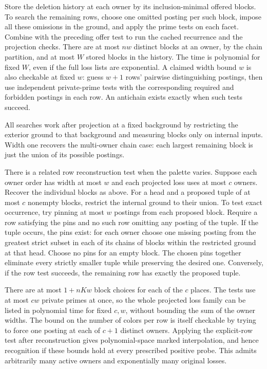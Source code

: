 Store the deletion history at each owner by its
inclusion-minimal offered blocks. To search the
remaining rows, choose one omitted posting per such
block, impose all these omissions in the ground,
and apply the prime tests on each facet. Combine with
the preceding offer test to run the cached recurrence
and the projection checks. There are at most $nw$
distinct blocks at an owner, by the chain partition,
and at most $W$ stored blocks in the history.
The time is polynomial for fixed $W$, even if the
full loss lists are exponential. A claimed width bound
$w$ is also checkable at fixed $w$: guess $w+1$
rows' pairwise distinguishing postings, then use
independent private-prime tests with the corresponding
required and forbidden postings in each row.
An antichain exists exactly when such tests succeed.

All searches work after projection at a fixed
background by restricting the exterior ground to that
background and measuring blocks only on internal
inputs. Width one recovers the multi-owner chain
case: each largest remaining block is just the union
of its possible postings.

There is a related row reconstruction test when the
palette varies. Suppose each owner order has width
at most $w$ and each projected loss uses at most
$c$ owners. Recover the individual blocks as above.
For a head and a proposed tuple of at most $c$
nonempty blocks, restrict the internal ground to
their union. To test exact occurrence, try pinning
at most $w$ postings from each proposed block.
Require a row satisfying the pins and no such row
omitting any posting of the tuple. If the tuple
occurs, the pins exist: for each owner choose one
missing posting from the greatest strict subset in
each of its chains of blocks within the restricted
ground at that head. Choose no pins for an empty
block. The chosen pins together eliminate every
strictly smaller tuple while preserving the desired
one. Conversely, if the row test succeeds, the
remaining row has exactly the proposed tuple.

There are at most $1+nKw$ block choices for each
of the $c$ places. The tests use at most $cw$
private primes at once, so the whole projected
loss family can be listed in polynomial time for
fixed $c,w$, without bounding the sum of the owner
widths. The bound on the number of colors per
row is itself checkable by trying to force one
posting at each of $c+1$ distinct owners. Applying
the explicit-row test after reconstruction gives
polynomial-space marked interpolation, and hence
recognition if these bounds hold at every prescribed
positive probe. This admits arbitrarily many active
owners and exponentially many original losses.

